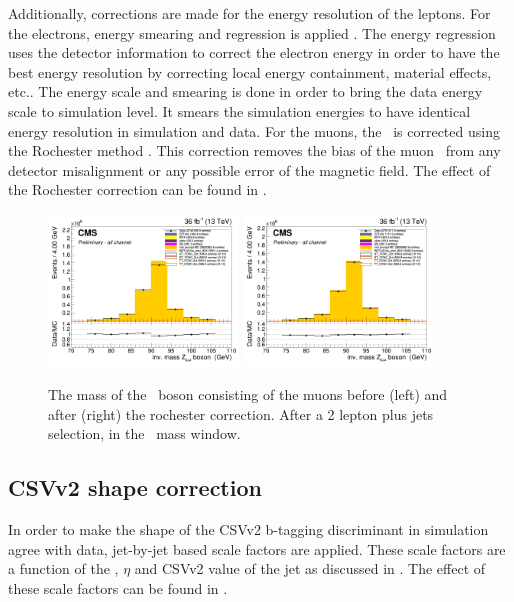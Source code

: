 Additionally, corrections are made for the energy resolution of the leptons. For the electrons, energy smearing and regression is applied \cite{smearing}. The energy regression uses the detector information to correct the electron energy in order to have the best energy resolution by correcting local energy containment, material effects, etc.. The energy scale and smearing is done in order to bring the data energy scale to simulation level. It smears the simulation energies to have identical energy resolution in simulation and data. For the muons, the \pt\ is corrected using the Rochester method \cite{roch,roch2}. This correction removes the bias of the muon \pt\ from any detector misalignment or any possible error of the magnetic field.
The effect of the Rochester correction can be found in .

\begin{figure}[htbp]
	\centering	
	\includegraphics[width=0.45\textwidth]{5_Eventselection/Figures/Reweighing/rochester/2lepcontrol_afterAtLeast1Jet_afterZWindow_ZbosonMassMu_all_Stack_before}
	\includegraphics[width=0.45\textwidth]{5_Eventselection/Figures/Reweighing/rochester/2lepcontrol_afterAtLeast1Jet_afterZWindow_ZbosonMassMu_all_Stack_after}
	
	\caption{The mass of the \PZ\ boson consisting of the muons before (left) and after (right) the rochester correction. After a 2 lepton plus jets selection, in the \PZ\ mass window.}
	\label{fig:roch}
\end{figure}

\clearpage
\subsection*{CSVv2 shape correction}
In order to make the shape of the CSVv2 b-tagging discriminant in simulation agree with data,  jet-by-jet based scale factors are applied. These scale factors are a function of the \pt, $\eta$ and CSVv2 value of the jet as discussed in .  The effect of these scale factors can be found in .


